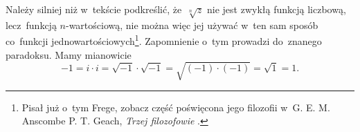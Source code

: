 \documentclass[a4paper,11pt]{article}
\begin{document}
\vspace{\spaceFour}



\start {} Należy silniej niż w~tekście podkreślić,
że~$\sqrt[n]{ z }$ nie jest zwykłą funkcją liczbową, lecz~funkcją
$n$-wartościową, nie można więc jej używać w~ten sam sposób co~funkcji
jednowartościowych\footnote{Pisał już o~tym Frege, zobacz część
  poświęcona jego filozofii w~G. E. M. Anscombe P. T. Geach,
  \emph{Trzej filozofowie} \cite{AnscombeGeachTrzejFilozofowie1981}.}.
Zapomnienie o~tym prowadzi do~znanego paradoksu. Mamy mianowicie
\begin{equation}
  \label{eq:Leja-08}
  -1 = i \cdot i = \sqrt{ -1 } \cdot \sqrt{ -1 } = \sqrt{ ( -1 ) \cdot ( -1 ) }
  = \sqrt{ 1 } = 1.
\end{equation}



\end{document}
